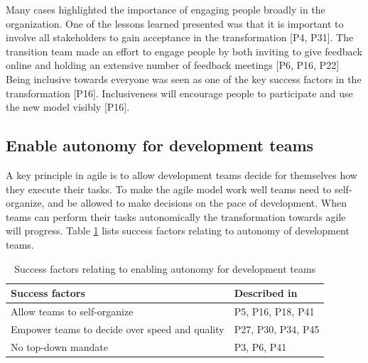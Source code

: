 





Many cases highlighted the importance of engaging people broadly in the
organization.
One of the lessons learned presented was that it is important to involve all
stakeholders to gain acceptance in the transformation [P4, P31]. The transition
team made an effort to engage people by both inviting to give feedback online
and holding an extensive number of feedback meetings [P6, P16, P22] Being
inclusive towards everyone was seen as one of the key success factors in the
transformation [P16]. Inclusiveness will encourage people to participate and use
the new model visibly [P16].


\subsection{Enable autonomy for development teams}

A key principle in agile is to allow development teams decide for themselves how
they execute their tasks. To make the agile model work well teams need to
self-organize, and be allowed to make decisions on the pace of development.
When teams can perform their tasks autonomically the transformation towards
agile will progress.
Table \ref{table:success_autonomy} lists success factors relating to autonomy of
development teams.

\begin{table}[h]
    \centering
    \begin{tabular}{ >{\raggedright\arraybackslash}p{}
                     >{\raggedright\arraybackslash}p{} }
        \toprule
        Success factors  &  Described in \\
        \midrule
        Allow teams to self-organize  &
                P5, P16, P18, P41  \\
        Empower teams to decide over speed and quality  &
                P27, P30, P34, P45  \\
        No top-down mandate  &
                P3, P6, P41  \\
        \bottomrule
    \end{tabular}
    \caption{Success factors relating to enabling autonomy for development teams}
    \label{table:success_autonomy}
\end{table}

